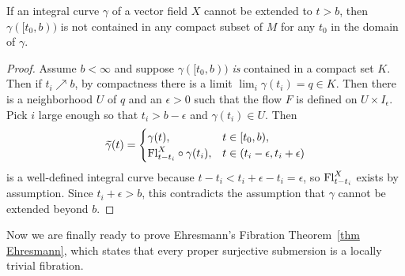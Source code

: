 \begin{lem}\label{lem escape}
    If an integral curve $\gamma$ of a vector field $X$ cannot be extended to $t>b$, then $\gamma([t_0,b))$ is not contained in any compact subset of $M$ for any $t_0$ in the domain of $\gamma$.
\end{lem}
\begin{proof}
    Assume $b<\infty$ and suppose $\gamma([t_0,b))$ \emph{is} contained in a compact set $K$. Then if $t_i\nearrow b$, by compactness there is a limit $\lim_i\gamma(t_i)=q\in K$. Then there is a neighborhood $U$ of $q$ and an $\epsilon>0$ such that the flow $F$ is defined on $U\times I_\epsilon$. Pick $i$ large enough so that $t_i>b-\epsilon$ and $\gamma(t_i)\in U$. Then 
    \[
        \wt{\gamma}(t)=
        \begin{cases} 
            \gamma(t), & t\in[t_0,b),\\ 
            \Fl^X_{t-t_i}\circ \gamma(t_i), & t\in (t_i-\epsilon,t_i+\epsilon)   
        \end{cases}
    \]
    is a well-defined integral curve because $t-t_i<t_i+\epsilon-t_i=\epsilon$, so $\mathrm{Fl}^X_{t-t_i}$ exists by assumption. Since $t_i+\epsilon>b$, this contradicts the assumption that $\gamma $ cannot be extended beyond $b$.
\end{proof}


Now we are finally ready to prove Ehresmann's Fibration Theorem~\ref{thm Ehresmann}, which states that every proper surjective submersion is a locally trivial fibration.

